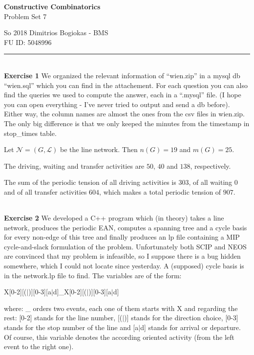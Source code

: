 \documentclass[12pt]{article}
\newenvironment{a_enum}{\begin{enumerate}[label=(\alph{*})]}{\end{enumerate}} %
\newcommand\HRule{\rule{\linewidth}{0.1mm}}
\begin{document}
\begin{center}
{\bf Constructive Combinatorics}\\
Problem Set 7
\end{center}
So 2018 \hfill Dimitrios Bogiokas - BMS\\
\phantom{X}\hfill FU ID: 5048996\\
\HRule\\
{\bf Exercise 1} We organized the relevant information of ``wien.zip'' in a mysql db ``wien.sql'' which you can find in the attachement. For each question you can also find the queries we used to compute the answer, each in a ``.mysql'' file. (I hope you can open everything - I've never tried to output and send a db before). Either way, the column names are almost the ones from the csv files in wien.zip. The only big difference is that we only keeped the minutes from the timestamp in stop\_times table.
\begin{a_enum}\item Let $\mathcal{N}=(G,\mathcal{L})$ be the line network. Then $n(G)=19$ and $m(G)=25$.
\item The driving, waiting and transfer activities are $50$, $40$ and $138$, respectively.
\item The sum of the periodic tension of all driving activities is $303$, of all waiting $0$ and of all transfer activities $604$, which makes a total periodic tension of $907$.
\end{a_enum}
\ \\
{\bf Exercise 2} We developed a C++ program which (in theory) takes a line network, produces the periodic EAN, computes a spanning tree and a cycle basis for every non-edge of this tree and finally produces an lp file containing a MIP cycle-and-slack formulation of the problem. Unfortunately both SCIP and NEOS are convinced that my problem is infeasible, so I suppose there is a bug hidden somewhere, which I could not locate since yesterday. A (supposed) cycle basis is in the network.lp file to find. The variables are of the form:
\begin{center}
X[0-2][($|$)][0-3][a$|$d]\_X[0-2][($|$)][0-3][a$|$d]
\end{center}
where: \_ orders two events, each one of them starts with X and regarding the rest: [0-2] stands for the line number, [($|$)] stands for the direction choice, [0-3] stands for the stop number of the line and [a$|$d] stands for arrival or departure. Of course, this variable denotes the according oriented activity (from the left event to the right one).
\end{document}

